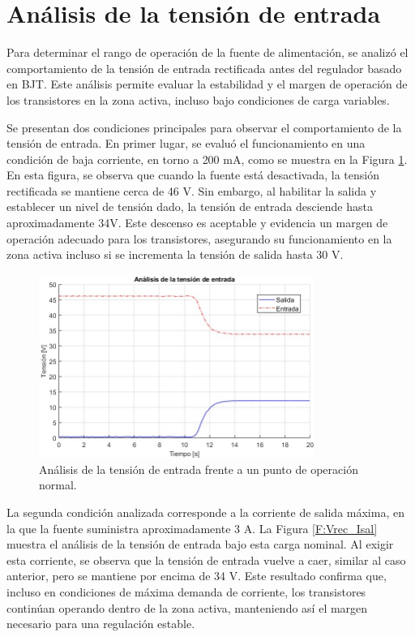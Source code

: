 \section{Análisis de la tensión de entrada}
Para determinar el rango de operación de la fuente de alimentación, se analizó el comportamiento de la tensión de entrada rectificada antes del regulador basado en BJT. Este análisis permite evaluar la estabilidad y el margen de operación de los transistores en la zona activa, incluso bajo condiciones de carga variables. \par

Se presentan dos condiciones principales para observar el comportamiento de la tensión de entrada. En primer lugar, se evaluó el funcionamiento en una condición de baja corriente, en torno a 200 mA, como se muestra en la Figura \ref{F:Tension_entrada_12}. En esta figura, se observa que cuando la fuente está desactivada, la tensión rectificada se mantiene cerca de 46 V. Sin embargo, al habilitar la salida y establecer un nivel de tensión dado, la tensión de entrada desciende hasta aproximadamente 34V. Este descenso es aceptable y evidencia un margen de operación adecuado para los transistores, asegurando su funcionamiento en la zona activa incluso si se incrementa la tensión de salida hasta 30 V. \par

\begin{figure}[H]
    \centering
    \includegraphics[width=0.8\textwidth]{./imagenes/Tension_12.jpg}
    \caption{Análisis de la tensión de entrada frente a un punto de operación normal.}
    \label{F:Tension_entrada_12}
\end{figure}\par

La segunda condición analizada corresponde a la corriente de salida máxima, en la que la fuente suministra aproximadamente 3 A. La Figura \ref{F:Vrec_Isal} muestra el análisis de la tensión de entrada bajo esta carga nominal. Al exigir esta corriente, se observa que la tensión de entrada vuelve a caer, similar al caso anterior, pero se mantiene por encima de 34 V. Este resultado confirma que, incluso en condiciones de máxima demanda de corriente, los transistores continúan operando dentro de la zona activa, manteniendo así el margen necesario para una regulación estable. \par


